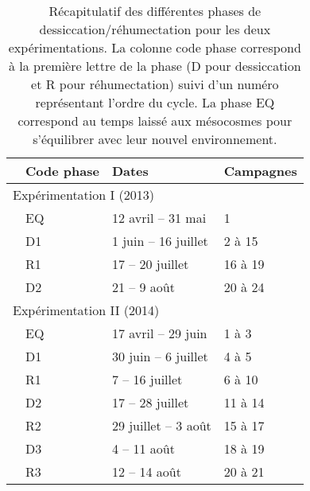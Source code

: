 

\begin{table}
\centering
\caption{Récapitulatif des différentes phases de dessiccation/réhumectation pour les deux expérimentations. La colonne code phase correspond à la première lettre de la phase (D pour dessiccation et R pour réhumectation) suivi d'un numéro représentant l'ordre du cycle. La phase EQ correspond au temps laissé aux mésocosmes pour s'équilibrer avec leur nouvel environnement.}
\label{table:recap_DR}
\begin{tabular}{llll}\toprule
 & Code phase & Dates & Campagnes \\ \midrule
\multicolumn{4}{l}{Expérimentation I (2013)} \\
 & EQ & 12 avril -- 31 mai & 1 \\ [+.5ex]
 & D1 & 1 juin -- 16 juillet & 2 à 15 \\
 & R1 & 17 -- 20 juillet & 16 à 19 \\
 & D2 & 21 -- 9 août & 20 à 24 \\ [+1ex]
\multicolumn{4}{l}{Expérimentation II (2014)} \\
 & EQ & 17 avril -- 29 juin & 1 à 3 \\ [+.5ex]
 & D1 & 30 juin -- 6 juillet & 4 à 5 \\
 & R1 & 7 -- 16 juillet & 6 à 10 \\ [+.5ex]
 & D2 & 17 -- 28 juillet & 11 à 14\\
 & R2 & 29 juillet -- 3 août & 15 à 17\\[+.5ex]
 & D3 & 4 -- 11 août & 18 à 19\\
 & R3 & 12 -- 14 août & 20 à 21\\
\bottomrule
\end{tabular}
\end{table}


